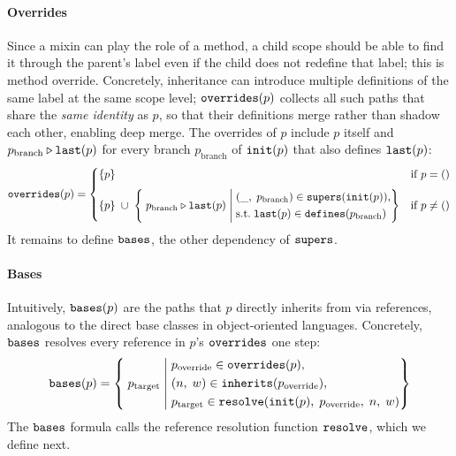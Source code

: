 \paragraph{Overrides}
Since a mixin can play the role of a method,
a child scope should be
able to find it through the parent's label even if the child
does not redefine that label; this is method override.
Concretely, inheritance can introduce multiple
definitions of the same label at the same scope level;
$\mathtt{overrides}(p)$ collects all such paths that share the
\emph{same identity} as $p$, so that their definitions
merge rather than shadow each other, enabling deep merge.
The overrides of $p$ include $p$ itself
and $p_{\mathrm{branch}} \mathbin{\triangleright} \mathtt{last}(p)$ for every
branch $p_{\mathrm{branch}}$ of $\mathtt{init}(p)$ that also defines $\mathtt{last}(p)$:
\begin{equation}\label{eq:overrides}
  \mathtt{overrides}(p) =
  \begin{cases}
    \{p\} & \text{if } p = ()  \\[6pt]
    \{p\}
    \;\cup\;
    \left\{\; p_{\mathrm{branch}} \mathbin{\triangleright} \mathtt{last}(p) \;\middle|\;
      \begin{aligned}
        &(\_,\; p_{\mathrm{branch}}) \in \mathtt{supers}(\mathtt{init}(p)), \\
        &\text{s.t.}\; \mathtt{last}(p) \in \mathtt{defines}(p_{\mathrm{branch}})
      \end{aligned}
    \right\}
    & \text{if } p \neq ()
  \end{cases}
\end{equation}
It remains to define $\mathtt{bases}$, the other dependency of $\mathtt{supers}$.

\paragraph{Bases}
Intuitively, $\mathtt{bases}(p)$ are the paths that $p$ directly
inherits from via references, analogous to the direct base
classes in object-oriented languages.
Concretely, $\mathtt{bases}$ resolves every reference in
$p$'s $\mathtt{overrides}$ one step:
\begin{equation}\label{eq:bases}
  \mathtt{bases}(p) =
  \left\{\; p_{\mathrm{target}} \;\middle|\;
    \begin{aligned}
      &p_{\mathrm{override}} \in \mathtt{overrides}(p), \\
      &(n,\; w) \in \mathtt{inherits}(p_{\mathrm{override}}), \\
      &p_{\mathrm{target}} \in \mathtt{resolve}(\mathtt{init}(p),\; p_{\mathrm{override}},\; n,\; w)
    \end{aligned}
  \right\}
\end{equation}
The $\mathtt{bases}$ formula calls the reference resolution function $\mathtt{resolve}$, which we define next.


